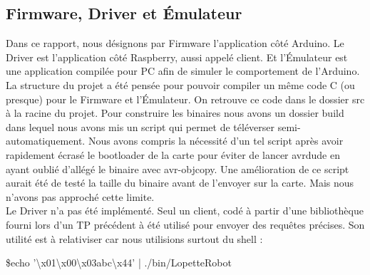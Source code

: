 \subsection{Firmware, Driver et Émulateur}
Dans ce rapport, nous désignons par Firmware l'application côté Arduino. 
Le Driver est l'application côté Raspberry, aussi appelé client. Et l'Émulateur
est une application compilée pour PC afin de simuler le comportement de
l'Arduino.\\

La structure du projet a été pensée pour pouvoir compiler un même code C
(ou presque) pour le Firmware et l'Émulateur. On retrouve ce code dans le
dossier src à la racine du projet. Pour construire les binaires nous avons 
un dossier build dans lequel nous avons mis un script qui permet de 
téléverser semi-automatiquement. Nous avons
compris la nécessité d'un tel script après avoir rapidement écrasé le bootloader
de la carte pour éviter de lancer avrdude en ayant oublié d'allégé le binaire
avec avr-objcopy. Une amélioration de ce script aurait été de testé la taille 
du binaire avant de l'envoyer sur la carte. Mais nous n'avons pas approché
cette limite.\\

Le Driver n'a pas été implémenté. Seul un client, codé à partir d'une bibliothèque
fourni lors d'un TP précédent à été utilisé pour envoyer des requêtes précises.
Son utilité est à relativiser car nous utilisions surtout du shell :
\begin{center}
  \$echo '\textbackslash x01\textbackslash x00\textbackslash x03abc\textbackslash x44' | ./bin/LopetteRobot
\end{center}

